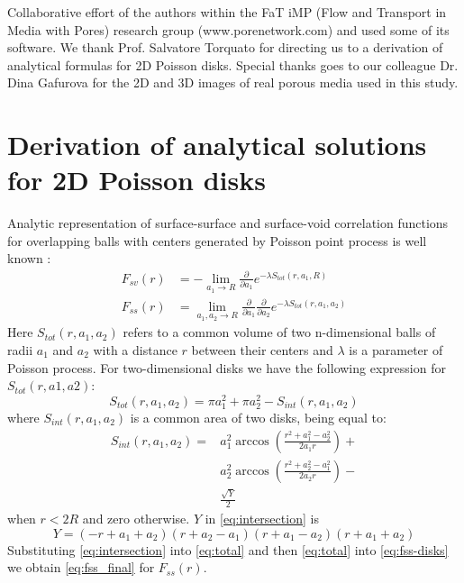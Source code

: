 \documentclass[reprint,amsmath,amssymb,aps,pre,showkeys,showpacs]{revtex4-1}
\begin{document}
Collaborative effort of the authors within the FaT iMP (Flow and Transport in
Media with Pores) research group (www.porenetwork.com) and used some of its
software. We thank Prof. Salvatore Torquato for directing us to a
derivation of analytical formulas for 2D Poisson disks. Special thanks goes to
our colleague Dr. Dina Gafurova for the 2D and 3D images of real porous media
used in this study.

\appendix
\section{Derivation of analytical solutions for 2D Poisson disks}
\label{ap:overlapping-disks}
Analytic representation of surface-surface and surface-void correlation
functions for overlapping balls with centers generated by Poisson point process
is well known \cite{Torquato_book}:
\begin{align}
  F_{sv}(r) &= -\lim_{a_1 \rightarrow R} \frac{\partial}{\partial a_1}
  e^{-\lambda S_{tot}(r, a_1, R)} \label{eq:fsv-disks} \\
  F_{ss}(r) &= \lim_{a_1, a_2 \rightarrow R} \frac{\partial}{\partial a_1}
  \frac{\partial}{\partial a_2} e^{-\lambda S_{tot}(r, a_1,
    a_2)} \label{eq:fss-disks}
\end{align}
Here $S_{tot}(r, a_1, a_2)$ refers to a common volume of two n-dimensional balls
of radii $a_1$ and $a_2$ with a distance $r$ between their centers and $\lambda$
is a parameter of Poisson process. For two-dimensional disks we have the
following expression for $S_{tot}(r, a1, a2)$:
\begin{equation}
  S_{tot}(r, a_1, a_2) = \pi a_1^2 + \pi a_2^2 - S_{int}(r, a_1, a_2) \label{eq:total}
\end{equation}
where $S_{int}(r, a_1, a_2)$ is a common area of two disks, being equal to:
\begin{align}
  S_{int}(r, a_1, a_2) =&  a_1^2 \arccos(\frac{r^2+a_1^2-a_2^2}{2a_1r}) + \\
  & a_2^2 \arccos(\frac{r^2+a_2^2-a_1^2}{2a_2r}) - \\
  & \frac{\sqrt{Y}}{2} \label{eq:intersection}
\end{align}
when $r<2R$ and zero otherwise. $Y$ in \cref{eq:intersection} is
\begin{equation*}
  Y = (-r+a_1+a_2)(r+a_2-a_1)(r+a_1-a_2)(r+a_1+a_2)
\end{equation*}
Substituting \cref{eq:intersection} into \cref{eq:total} and then
\cref{eq:total} into \cref{eq:fss-disks} we obtain \cref{eq:fss_final} for
$F_{ss}(r)$.
\end{document}
